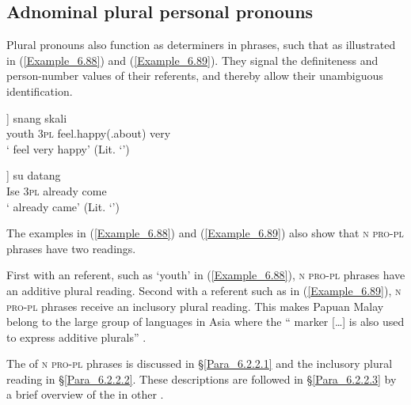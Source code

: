 \subsection{Adnominal plural personal pronouns}
\label{Para_6.2.2}
Plural pronouns also function as determiners in  phrases, such that as illustrated in (\ref{Example_6.88}) and (\ref{Example_6.89}). They signal the definiteness and person-number values of their referents, and thereby allow their unambiguous identification.


\ea
\label{Example_6.88}
\gll {[\bluebold{pemuda}} {]} {snang} {skali}\\ %
 youth  \textsc{3pl}  feel.happy(.about)  very\\

\glt
‘ feel very happy’ (Lit. ‘’) \textstyleExampleSource{[080925-003-Cv.0220]}
\z

\ea
\label{Example_6.89}
\gll {[\bluebold{Ise}} {]} {su} {datang}\\ %
 Ise  \textsc{3pl}  already  come\\

\glt
‘ already came’ (Lit. ‘’) \textstyleExampleSource{[080925-003-Cv.0169]}
\z


The examples in (\ref{Example_6.88}) and (\ref{Example_6.89}) also show that \textsc{n} \textsc{pro-pl}  phrases have two readings.



First with an  referent, such as  ‘youth’ in (\ref{Example_6.88}), \textsc{n} \textsc{pro-pl}  phrases have an additive plural reading. Second with a  referent such as  in (\ref{Example_6.89}), \textsc{n} \textsc{pro-pl}  phrases receive an  inclusory plural reading. This makes Papuan Malay belong to the large group of languages in Asia where the “ marker [{\ldots}] is also used to express additive plurals” \citep[5–6]{Daniel.2013}.



The  of \textsc{n} \textsc{pro-pl}  phrases is discussed in §\ref{Para_6.2.2.1} and the  inclusory plural reading in §\ref{Para_6.2.2.2}. These descriptions are followed in §\ref{Para_6.2.2.3} by a brief overview of the  in other .


